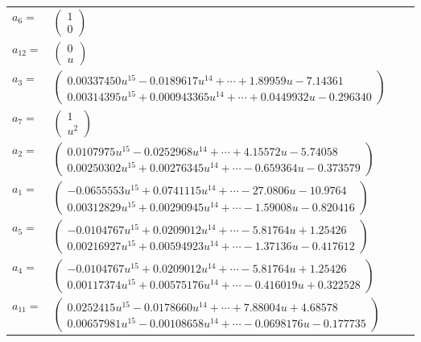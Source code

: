 \documentclass[1p]{elsarticle_modified}
\theoremstyle{definition}
\begin{document}
\begin{tabular}{m{7pt} m{180pt} m{7pt} m{180pt} }
\flushright $a_{6}=$&$\begin{pmatrix}1\\0\end{pmatrix}$ \\
\flushright $a_{12}=$&$\begin{pmatrix}0\\u\end{pmatrix}$ \\
\flushright $a_{3}=$&$\begin{pmatrix}0.00337450 u^{15}-0.0189617 u^{14}+\cdots+1.89959 u-7.14361\\0.00314395 u^{15}+0.000943365 u^{14}+\cdots+0.0449932 u-0.296340\end{pmatrix}$ \\
\flushright $a_{7}=$&$\begin{pmatrix}1\\u^2\end{pmatrix}$ \\
\flushright $a_{2}=$&$\begin{pmatrix}0.0107975 u^{15}-0.0252968 u^{14}+\cdots+4.15572 u-5.74058\\0.00250302 u^{15}+0.00276345 u^{14}+\cdots-0.659364 u-0.373579\end{pmatrix}$ \\
\flushright $a_{1}=$&$\begin{pmatrix}-0.0655553 u^{15}+0.0741115 u^{14}+\cdots-27.0806 u-10.9764\\0.00312829 u^{15}+0.00290945 u^{14}+\cdots-1.59008 u-0.820416\end{pmatrix}$ \\
\flushright $a_{5}=$&$\begin{pmatrix}-0.0104767 u^{15}+0.0209012 u^{14}+\cdots-5.81764 u+1.25426\\0.00216927 u^{15}+0.00594923 u^{14}+\cdots-1.37136 u-0.417612\end{pmatrix}$ \\
\flushright $a_{4}=$&$\begin{pmatrix}-0.0104767 u^{15}+0.0209012 u^{14}+\cdots-5.81764 u+1.25426\\0.00117374 u^{15}+0.00575176 u^{14}+\cdots-0.416019 u+0.322528\end{pmatrix}$ \\
\flushright $a_{11}=$&$\begin{pmatrix}0.0252415 u^{15}-0.0178660 u^{14}+\cdots+7.88004 u+4.68578\\0.00657981 u^{15}-0.00108658 u^{14}+\cdots-0.0698176 u-0.177735\end{pmatrix}$ \\

\end{tabular}
\end{document}
